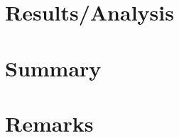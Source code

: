 \documentclass[12pt,titlepage,final]{article}
\begin{document}
\section{Results/Analysis}

\section{Summary}

\section{Remarks}

  
\end{document}
